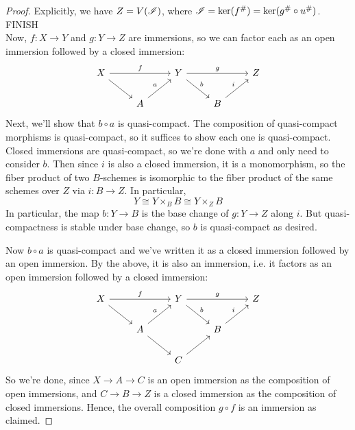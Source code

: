 \begin{proof}
	Explicitly, we have $Z = V(\mathscr{I})$, where $\mathscr{I} = \ker(f^\#) = \ker(g^\# \circ u^\#)$. FINISH \\
	
	Now, $f : X \to Y$ and $g : Y \to Z$ are immersions, so we can factor each as an open immersion followed by a closed immersion:
	\[ \begin{tikzcd} X \arrow[rr,"f"] \arrow[dr] & & Y \arrow[rr,"g"] \arrow[dr,"b"] & & Z \\ & A \arrow[ur,"a"] & & B \arrow[ur,"i"] \end{tikzcd} \]
	Next, we'll show that $b \circ a$ is quasi-compact. The composition of quasi-compact morphisms is quasi-compact, so it suffices to show each one is quasi-compact. Closed immersions are quasi-compact, so we're done with $a$ and only need to consider $b$. Then since $i$ is also a closed immersion, it is a monomorphism, so the fiber product of two $B$-schemes is isomorphic to the fiber product of the same schemes over $Z$ via $i : B \to Z$. In particular,
	\[ Y \cong Y \times_B B \cong Y \times_Z B \]
	In particular, the map $b : Y \to B$ is the base change of $g : Y \to Z$ along $i$. But quasi-compactness is stable under base change, so $b$ is quasi-compact as desired.
	
	Now $b \circ a$ is quasi-compact and we've written it as a closed immersion followed by an open immersion. By the above, it is also an immersion, i.e. it factors as an open immersion followed by a closed immersion:
	\[ \begin{tikzcd} X \arrow[rr,"f"] \arrow[dr] & & Y \arrow[rr,"g"] \arrow[dr,"b"] & & Z \\ & A \arrow[ur,"a"] \arrow[dr] & & B \arrow[ur,"i"] \\ & & C \arrow[ur] \end{tikzcd} \]
	So we're done, since $X \to A \to C$ is an open immersion as the composition of open immersions, and $C \to B \to Z$ is a closed immersion as the composition of closed immersions. Hence, the overall composition $g \circ f$ is an immersion as claimed.
\end{proof}
